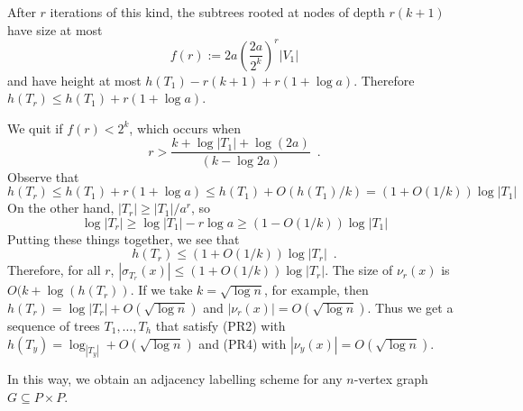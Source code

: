 \documentclass[kpfonts]{patmorin}
\begin{document}
After $r$ iterations of this kind, the subtrees rooted at nodes of depth $r(k+1)$ have size at most
\[
     f(r) := 2a\left(\frac{2a}{2^k}\right)^r|V_1|
\]
and have height at most $h(T_1)-r(k+1)+r(1+\log a)$.  Therefore $h(T_r)\le h(T_1)+r(1+\log a)$.

We quit if $f(r)<2^k$, which occurs when
\[
   r > \frac{k + \log |T_1| + \log(2a)}{(k-\log 2a)} \enspace .
\]
Observe that 
\[
   h(T_r) \le h(T_1)+r(1+\log a) \le h(T_1) + O(h(T_1)/k) = (1+O(1/k))\log|T_1|
\]
On the other hand, $|T_r|\ge |T_1|/a^r$, so
\[  \log |T_r| \ge \log|T_1| - r\log a \ge (1-O(1/k))\log|T_1| \]
Putting these things together, we see that 
\[
   h(T_r) \le (1+O(1/k))\log |T_r| \enspace .
\]
Therefore, for all $r$, $|\sigma_{T_r}(x)|\le (1+O(1/k))\log|T_r|$.  The size of $\nu_r(x)$ is $O(k+\log(h(T_r))$.  If we take $k=\sqrt{\log n}$, for example, then $h(T_r)=\log |T_r|+O(\sqrt{\log n})$ and $|\nu_r(x)|=O(\sqrt{\log n})$.  Thus we get a sequence of trees $T_1,\ldots,T_h$ that satisfy (PR2) with $h(T_y)=\log_|T_y| + O(\sqrt{\log n})$ and (PR4) with $|\nu_y(x)|=O(\sqrt{\log n})$.

In this way, we obtain an adjacency labelling scheme for any $n$-vertex graph $G\subseteq P\times P$.





% 
% 
% 

\end{document}
